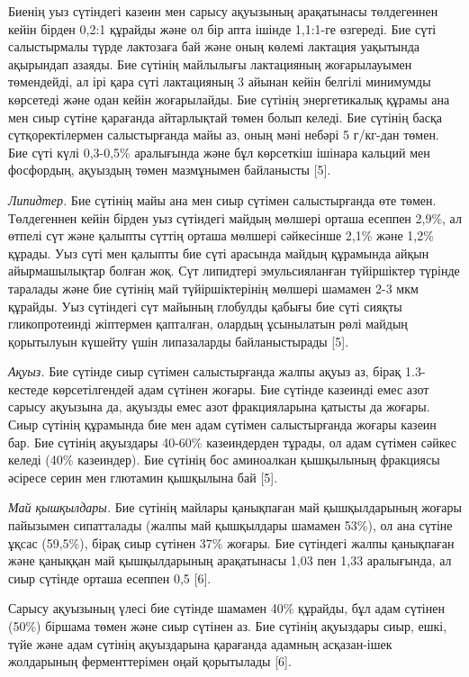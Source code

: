 Биенің уыз сүтіндегі казеин мен сарысу ақуызының арақатынасы төлдегеннен
кейін бірден 0,2:1 құрайды және ол бір апта ішінде 1,1:1-ге өзгереді.
Бие сүті салыстырмалы түрде лактозаға бай және оның көлемі лактация
уақытында ақырындап азаяды. Бие сүтінің майлылығы лактацияның
жоғарылауымен төмендейді, ал ірі қара сүті лактацияның 3 айынан кейін
белгілі минимумды көрсетеді және одан кейін жоғарылайды. Бие сүтінің
энергетикалық құрамы ана мен сиыр сүтіне қарағанда айтарлықтай төмен
болып келеді. Бие сүтінің басқа сүтқоректілермен салыстырғанда майы аз,
оның мәні небәрі 5 г/кг-дан төмен. Бие сүті күлі 0,3-0,5\% аралығында
және бұл көрсеткіш ішінара кальций мен фосфордың, ақуыздың төмен
мазмұнымен байланысты {[}5{]}.

\emph{Липидтер.} Бие сүтінің майы ана мен сиыр сүтімен салыстырғанда өте
төмен. Төлдегеннен кейін бірден уыз сүтіндегі майдың мөлшері орташа
есеппен 2,9\%, ал өтпелі сүт және қалыпты сүттің орташа мөлшері
сәйкесінше 2,1\% және 1,2\% құрады. Уыз сүті мен қалыпты бие сүті
арасында майдың құрамында айқын айырмашылықтар болған жоқ. Сүт липидтері
эмульсияланған түйіршіктер түрінде таралады және бие сүтінің май
түйіршіктерінің мөлшері шамамен 2-3 мкм құрайды. Уыз сүтіндегі сүт
майының глобулды қабығы бие сүті сияқты гликопротеинді жіптермен
қапталған, олардың ұсынылатын рөлі майдың қорытылуын күшейту үшін
липазаларды байланыстырады {[}5{]}.

\emph{Ақуыз.} Бие сүтінде сиыр сүтімен салыстырғанда жалпы ақуыз аз,
бірақ 1.3-кестеде көрсетілгендей адам сүтінен жоғары. Бие сүтінде
казеинді емес азот сарысу ақуызына да, ақуызды емес азот фракцияларына
қатысты да жоғары. Сиыр сүтінің құрамында бие мен адам сүтімен
салыстырғанда жоғары казеин бар. Бие сүтінің ақуыздары 40-60\%
казеиндерден тұрады, ол адам сүтімен сәйкес келеді (40\% казеиндер). Бие
сүтінің бос аминоалкан қышқылының фракциясы әсіресе серин мен глютамин
қышқылына бай {[}5{]}.

\emph{Май қышқылдары.} Бие сүтінің майлары қанықпаған май қышқылдарының
жоғары пайызымен сипатталады (жалпы май қышқылдары шамамен 53\%), ол ана
сүтіне ұқсас (59,5\%), бірақ сиыр сүтінен 37\% жоғары. Бие сүтіндегі
жалпы қанықпаған және қаныққан май қышқылдарының арақатынасы 1,03 пен
1,33 аралығында, ал сиыр сүтінде орташа есеппен 0,5 {[}6{]}.

Сарысу ақуызының үлесі бие сүтінде шамамен 40\% құрайды, бұл адам
сүтінен (50\%) біршама төмен және сиыр сүтінен аз. Бие сүтінің ақуыздары
сиыр, ешкі, түйе және адам сүтінің ақуыздарына қарағанда адамның
асқазан-ішек жолдарының ферменттерімен оңай қорытылады {[}6{]}.

